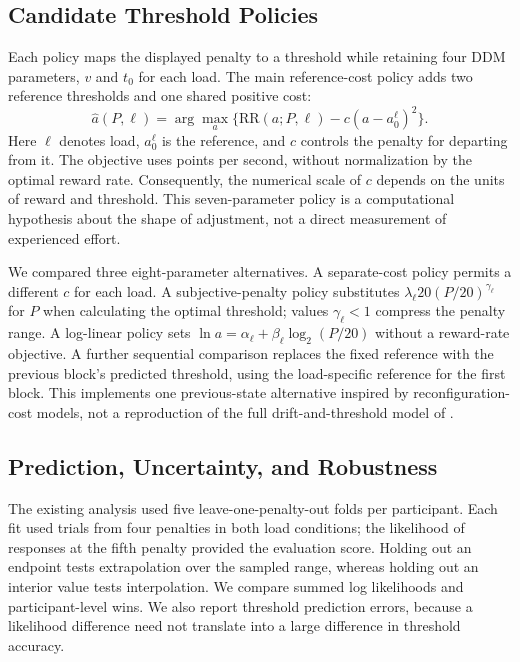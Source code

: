 \documentclass[10pt,letterpaper]{article}
\newcommand{\RR}{\mathrm{RR}}
\begin{document}
\subsection{Candidate Threshold Policies}
Each policy maps the displayed penalty to a threshold while retaining four DDM parameters, $v$ and $t_0$ for each load. The main reference-cost policy adds two reference thresholds and one shared positive cost:
\begin{equation}
\hat a(P,\ell)=\arg\max_a\{\RR(a;P,\ell)-c(a-a_0^\ell)^2\}.
\label{eq:cost}
\end{equation}
Here $\ell$ denotes load, $a_0^\ell$ is the reference, and $c$ controls the penalty for departing from it. The objective uses points per second, without normalization by the optimal reward rate. Consequently, the numerical scale of $c$ depends on the units of reward and threshold. This seven-parameter policy is a computational hypothesis about the shape of adjustment, not a direct measurement of experienced effort.

We compared three eight-parameter alternatives. A separate-cost policy permits a different $c$ for each load. A subjective-penalty policy substitutes $\lambda_\ell20(P/20)^{\gamma_\ell}$ for $P$ when calculating the optimal threshold; values $\gamma_\ell<1$ compress the penalty range. A log-linear policy sets $\ln a=\alpha_\ell+\beta_\ell\log_2(P/20)$ without a reward-rate objective. A further sequential comparison replaces the fixed reference with the previous block's predicted threshold, using the load-specific reference for the first block. This implements one previous-state alternative inspired by reconfiguration-cost models, not a reproduction of the full drift-and-threshold model of \citet{grahek2022}.

\subsection{Prediction, Uncertainty, and Robustness}
The existing analysis used five leave-one-penalty-out folds per participant. Each fit used trials from four penalties in both load conditions; the likelihood of responses at the fifth penalty provided the evaluation score. Holding out an endpoint tests extrapolation over the sampled range, whereas holding out an interior value tests interpolation. We compare summed log likelihoods and participant-level wins. We also report threshold prediction errors, because a likelihood difference need not translate into a large difference in threshold accuracy.
\end{document}
